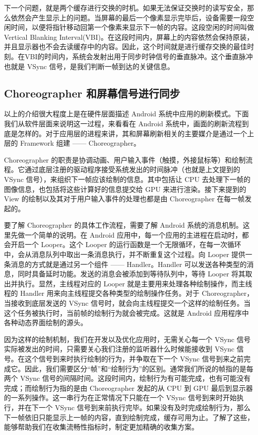下一个问题，就是两个缓存进行交换的时机。如果无法保证交换时的读写安全，那么依然会产生显示上的问题。当屏幕的最后一个像素显示完毕后，设备需要一段空闲时间，以便将指针移动回第一个像素来显示下一帧的内容。这段空闲的时间叫做 Vertical Blanking Interval(VBI)。在这段时间内，屏幕上的内容依然会保持原装，并且显示器也不会去读缓存中的内容。因此，这个时间就是进行缓存交换的最佳时刻。在VBI的时间内，系统会发射出用于同步时钟信号的垂直脉冲。这个垂直脉冲也就是 VSync 信号，是我们判断一帧到达的关键信息。

\subsection{Choreographer 和屏幕信号进行同步}

以上的介绍很大程度上是在硬件层面描述 Android 系统中应用的刷新模式。下面我们从软件层面来说明这一过程，来看看在 Android 系统中，画面的刷新流程到底是怎样的。对于应用层的进程来讲，其和屏幕刷新相关的主要媒介是通过一个上层的 Framework 组建 —— Choreographer。

Choreographer 的职责是协调动画、用户输入事件（触摸，外接鼠标等）和绘制流程。它通过底层注册的驱动程序接受系统发出的时间脉冲（也就是上文提到的 VSync 信号），来组织下一帧应该绘制的信息。其中包括让 CPU 去处理下一帧的图像信息，也包括将这些计算好的信息提交给 GPU 来进行渲染。接下来提到的 View 的绘制以及其对于用户输入事件的处理也都是由 Choreographer 在每一帧发起的。

要了解 Choreographer 的具体工作流程，需要了解 Android 系统的消息机制。这里先做一个简单的说明。在 Android 应用中，每一个应用的主进程在启动时，都会开启一个 Looper。这个 Looper 的运行函数是一个无限循环，在每一次循环中，会从消息队列中取出一条消息执行，并不断重复这个过程。向 Looper 提供一条消息的方式就是通过另一个组件 —— Handler。Handler 可以发送各种类型的消息，同时具备延时功能。发送的消息会被添加到等待队列中，等待 Looper 将其取出并执行。显然，主线程对应的 Looper 就是主要用来处理各种绘制操作，而主线程的 Handler 用来向主线程提交各种类型的绘制操作任务。对于 Choreographer，当接收到底层发送的 VSync 信号时，就会向主线程提交一个这样的绘制任务。当这个任务被执行时，当前帧的绘制行为就会被完成。这就是 Android 应用程序中各种动态界面绘制的源头。

因为这样的绘制机制，我们在开发以及优化应用时，无需关心每一个 VSync 信号实际被发出的时间，只需要关心我们注册的监听器什么时候能接收到 VSync 信号。在这个信号到来时执行绘制的行为，并争取在下一个 VSync 信号到来之前完成它。因此，我们需要区分“帧”和“绘制行为”的区别。通常我们所说的帧指的是每两个 VSync 信号的间隔时间。这段时间内，绘制行为有可能完成，也有可能没有完成；而绘制行为指的是由 Choreographer 发起的从 CPU 到 GPU 最后到显示器的一系列操作。这一串行为在正常情况下只能在一个 VSync 信号到来时开始执行，并在下一个 VSync 信号到来前执行完毕。如果没有及时完成绘制行为，那么下一帧依旧只能显示上一帧的内容，直到绘制完成，缓存可用为止。了解了这些，能够帮助我们在收集流畅性指标时，制定更加精确的收集方案。

